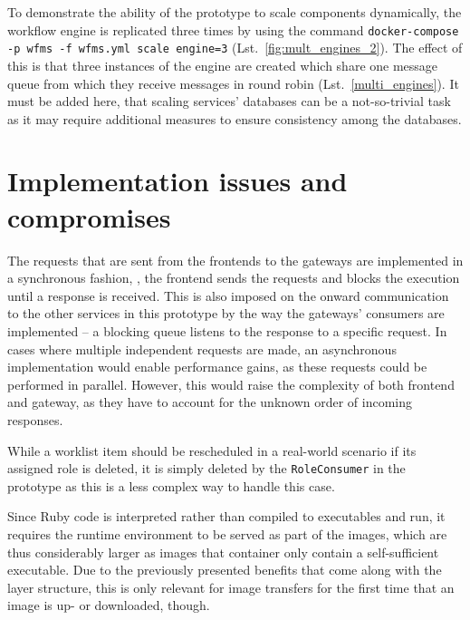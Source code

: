   To demonstrate the ability of the prototype to scale components dynamically, the workflow engine is replicated three times by using the command \texttt{docker-compose -p wfms -f wfms.yml scale engine=3} (Lst.~\ref{fig:mult_engines_2}). The effect of this is that three instances of the engine are created which share one message queue from which they receive messages in round robin (Lst.~\ref{multi_engines}). It must be added here, that scaling services' databases can be a not-so-trivial task as it may require additional measures to ensure consistency among the databases.

\section{Implementation issues and compromises} %
  \label{sec:implementation_issues}
  The requests that are sent from the frontends to the gateways are implemented in a synchronous fashion, \ie, the frontend sends the requests and blocks the execution until a response is received. This is also imposed on the onward communication to the other services in this prototype by the way the gateways' consumers are implemented -- a blocking queue listens to the response to a specific request. In cases where multiple independent requests are made, an asynchronous implementation would enable performance gains, as these requests could be performed in parallel. However, this would raise the complexity of both frontend and gateway, as they have to account for the unknown order of incoming responses.

  While a worklist item should be rescheduled in a real-world scenario if its assigned role is deleted, it is simply deleted by the \texttt{RoleConsumer} in the prototype as this is a less complex way to handle this case.

  Since Ruby code is interpreted rather than compiled to executables and run, it requires the runtime environment to be served as part of the images, which are thus considerably larger as images that container only contain a self-sufficient executable. Due to the previously presented benefits that come along with the layer structure, this is only relevant for image transfers for the first time that an image is up- or downloaded, though.

